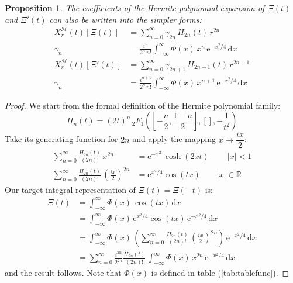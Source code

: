 \documentclass[a4paper,11pt,twoside]{amsart}
\newtheorem{proposition}[theorem]{Proposition}
\newcommand{\verifiedeq}{=}
\newcommand{\defeq}{=}
\newcommand{\verifiedeq}{\stackrel{\checkmark}{=}}
\newcommand{\defeq}{\stackrel{\scriptscriptstyle \textnormal{def}}{=}}
\begin{document}
\begin{proposition}
The coefficients of the Hermite polynomial expansion of $\Xi(t)$ and $\Xi'(t)$ can also be written into the simpler forms: 
\begin{align}
X^{\mathcal{H}}_r(t)\left[\Xi(t)\right] &\verifiedeq \sum_{n=0}^\infty \gamma_{2n}\,H_{2n}(t)\,r^{2n} \label{herm1}\\ 
\gamma_n &\verifiedeq \frac{i^n}{2^{n}\,n!}\int_{-\infty}^{\infty} \Phi(x)\,x^n\,\mathrm{e}^{-x^2/4}\,\mathrm{d}x \\
X^{\mathcal{H}}_r(t)\left[\Xi'(t)\right] &\verifiedeq \sum_{n=0}^\infty \gamma_{2n+1}\,H_{2n+1}(t)\,r^{2n+1} \label{herm2}\\ 
\gamma_n &\verifiedeq \frac{i^{n+1}}{2^{n}\,n!}\int_{-\infty}^{\infty} \Phi(x)\,x^{n+1}\,\mathrm{e}^{-x^2/4}\,\mathrm{d}x
\end{align}
\end{proposition}
\begin{proof}
We start from the formal definition of the Hermite polynomial family:
\begin{equation}
 H_n(t) \defeq (2t)^n\, {}_2F_1\left(\left[-\frac{n}{2}, \frac{1-n}{2}\right],[],-\frac{1}{t^2}\right) 
\end{equation}
Take its generating function for $2n$ and apply the mapping $x \mapsto \dfrac{ix}{2}$:
\begin{align}
 \sum_{n=0}^\infty \frac{H_{2n}(t)}{(2n)!}\, x^{2n} &\verifiedeq \mathrm{e}^{-x^2}\,\cosh(2xt) \ \qquad |x| < 1 \\
 \sum_{n=0}^\infty \frac{H_{2n}(t)}{(2n)!}\,\left(\frac{ix}{2}\right)^{2n} &\verifiedeq  \mathrm{e}^{x^2/4} \cos(tx)\qquad |x| \in \mathbb{R}
\end{align}
Our target integral representation of $\Xi(t) = \Xi(-t)$ is:
\begin{align}
 \Xi(t) &\verifiedeq \int_{-\infty}^\infty \Phi(x)\,\cos(tx)\, \mathrm{d}x \\
  & \verifiedeq \int_{-\infty}^\infty \Phi(x)\,\mathrm{e}^{x^2/4}\cos(tx)\,\mathrm{e}^{-x^2/4}\,\mathrm{d}x \\
  & \verifiedeq \int_{-\infty}^\infty \Phi(x)\,\left(\sum_{n=0}^\infty \frac{H_{2n}(t)}{(2n)!}\,\left(\frac{ix}{2}\right)^{2n} \right)\,\mathrm{e}^{-x^2/4}\,\mathrm{d}x \\
  & \verifiedeq \sum_{n=0}^\infty \frac{i^{2n}}{2^{2n}}\frac{H_{2n}(t)}{(2n)!}\,\int_{-\infty}^\infty \Phi(x)\,x^{2n}\,\mathrm{e}^{-x^2/4}\,\mathrm{d}x
\end{align}
and the result follows. Note that $\Phi(x)$ is defined in table (\ref{tab:tablefunc}).
\end{proof}
\end{document}
